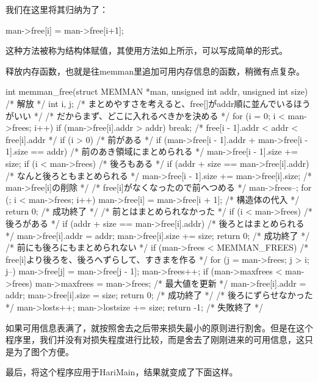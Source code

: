 我们在这里将其归纳为了：
\begin{code}
man->free[i] = man->free[i+1];
\end{code}

这种方法被称为结构体赋值，其使用方法如上所示，可以写成简单的形式。

\cs

释放内存函数，也就是往memman里追加可用内存信息的函数，稍微有点复杂。

\begin{code}[label=bootpack.c节选]
int memman_free(struct MEMMAN *man, unsigned int addr, unsigned int size)
/* 解放 */
{
	int i, j;
	/* まとめやすさを考えると、free[]がaddr順に並んでいるほうがいい */
	/* だからまず、どこに入れるべきかを決める */
	for (i = 0; i < man->frees; i++) {
		if (man->free[i].addr > addr) {
			break;
		}
	}
	/* free[i - 1].addr < addr < free[i].addr */
	if (i > 0) {
		/* 前がある */
		if (man->free[i - 1].addr + man->free[i - 1].size == addr) {
			/* 前のあき領域にまとめられる */
			man->free[i - 1].size += size;
			if (i < man->frees) {
				/* 後ろもある */
				if (addr + size == man->free[i].addr) {
					/* なんと後ろともまとめられる */
					man->free[i - 1].size += man->free[i].size;
					/* man->free[i]の削除 */
					/* free[i]がなくなったので前へつめる */
					man->frees--;
					for (; i < man->frees; i++) {
						man->free[i] = man->free[i + 1]; /* 構造体の代入 */
					}
				}
			}
			return 0; /* 成功終了 */
		}
	}
	/* 前とはまとめられなかった */
	if (i < man->frees) {
		/* 後ろがある */
		if (addr + size == man->free[i].addr) {
			/* 後ろとはまとめられる */
			man->free[i].addr = addr;
			man->free[i].size += size;
			return 0; /* 成功終了 */
		}
	}
	/* 前にも後ろにもまとめられない */
	if (man->frees < MEMMAN_FREES) {
		/* free[i]より後ろを、後ろへずらして、すきまを作る */
		for (j = man->frees; j > i; j--) {
			man->free[j] = man->free[j - 1];
		}
		man->frees++;
		if (man->maxfrees < man->frees) {
			man->maxfrees = man->frees; /* 最大値を更新 */
		}
		man->free[i].addr = addr;
		man->free[i].size = size;
		return 0; /* 成功終了 */
	}
	/* 後ろにずらせなかった */
	man->losts++;
	man->lostsize += size;
	return -1; /* 失敗終了 */
}
\end{code}

如果可用信息表满了，就按照舍去之后带来损失最小的原则进行割舍。但是在这个程序里，我们并没有对损失程度进行比较，而是舍去了刚刚进来的可用信息，这只是为了图个方便。

\cs

最后，将这个程序应用于HariMain，结果就变成了下面这样。

